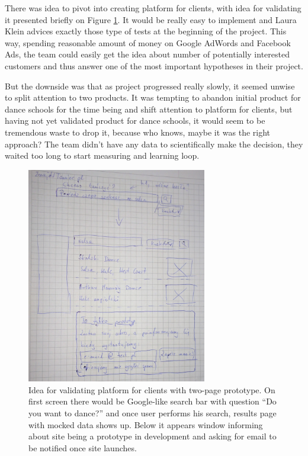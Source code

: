 \documentclass{article}
\begin{document}
There was idea to pivot into creating platform for clients, with idea for validating it presented briefly on Figure \ref{fig:znajdz-taniec}. It would be really easy to implement and Laura Klein \cite{klein2013ux} advices exactly those type of tests at the beginning of the project. This way, spending reasonable amount of money on Google AdWords and Facebook Ads, the team could easily get the idea about number of potentially interested customers and thus answer one of the most important hypotheses in their project.

But the downside was that as project progressed really slowly, it seemed unwise to split attention to two products. It was tempting to abandon initial product for dance schools for the time being and shift attention to platform for clients, but having not yet validated product for dance schools, it would seem to be tremendous waste to drop it, because who knows, maybe it was the right approach? The team didn't have any data to scientifically make the decision, they waited too long to start measuring and learning loop.

\begin{figure}[h]
    \centering
    \includegraphics[width=0.7\textwidth]{znajdz-taniec}
    \caption{Idea for validating platform for clients with two-page prototype. On first screen there would be Google-like search bar with question ``Do you want to dance?'' and once user performs his search, results page with mocked data shows up. Below it appears window informing about site being a prototype in development and asking for email to be notified once site launches.}
    \label{fig:znajdz-taniec} 
\end{figure}
\end{document}
